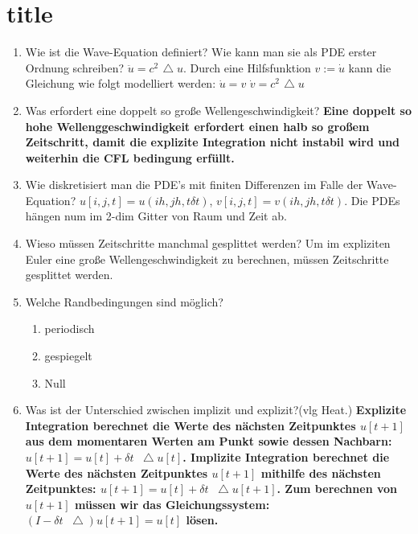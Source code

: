 \documentclass[10pt,a4paper,titlepage]{article}
\begin{document}
\section{title}
\begin{enumerate}[resume=b]
	\item Wie ist die Wave-Equation definiert? Wie kann man sie als PDE erster Ordnung schreiben? \newline
	$\ddot{u}=c^2 \mathop{\!\mathbin\bigtriangleup}u$. Durch eine Hilfsfunktion $v:=\dot{u}$ kann die Gleichung wie folgt modelliert werden: $\dot{u}=v$ $\dot{v}=c^2\mathop{\!\mathbin\bigtriangleup}u$
	\item Was erfordert eine doppelt so große Wellengeschwindigkeit? \newline
	\textbf{Eine doppelt so hohe Wellenggeschwindigkeit erfordert einen halb so großem Zeitschritt, damit die explizite Integration nicht instabil wird und weiterhin die CFL bedingung erfüllt. }
	\item Wie diskretisiert man die PDE's mit finiten Differenzen im Falle der Wave-Equation? \newline
	$u[i,j,t]=u(ih,jh,t\delta t)$, $v[i,j,t]=v(ih,jh,t\delta t)$. Die PDEs hängen num im 2-dim Gitter von Raum und Zeit ab.
	\item Wieso müssen Zeitschritte manchmal gesplittet werden?\newline
	Um im expliziten Euler eine große Wellengeschwindigkeit zu berechnen, müssen Zeitschritte gesplittet werden.
	\item Welche Randbedingungen sind möglich?\newline 
	\begin{enumerate}
		\item periodisch
		\item gespiegelt
		\item Null
	\end{enumerate}
	\item Was ist der Unterschied zwischen implizit und explizit?(vlg Heat.) \newline
	\textbf{Explizite Integration berechnet die Werte des nächsten Zeitpunktes $u[t+1]$ aus dem momentaren Werten am Punkt sowie dessen Nachbarn: $u[t+1]=u[t]+\delta t \mathop{}\!\mathbin\bigtriangleup u[t]$.
		Implizite Integration berechnet die Werte des nächsten Zeitpunktes $u[t+1]$ mithilfe des nächsten Zeitpunktes: $u[t+1]=u[t]+\delta t \mathop{}\!\mathbin\bigtriangleup u[t+1]$.
		Zum berechnen von $u[t+1]$ müssen wir das Gleichungssystem:$(I-\delta t \mathop{}\!\mathbin\bigtriangleup )u[t+1]=u[t]$ lösen.}

\end{enumerate}
\end{document}
